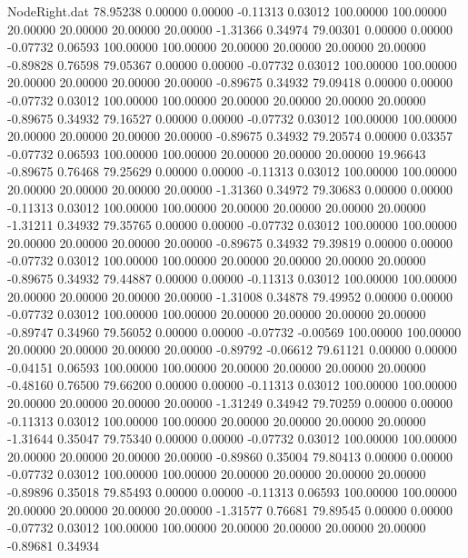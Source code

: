 \begin{filecontents}{NodeRight.dat}
  78.95238    0.00000    0.00000    -0.11313    0.03012  100.00000  100.00000   20.00000   20.00000   20.00000   20.00000   -1.31366    0.34974
  79.00301    0.00000    0.00000    -0.07732    0.06593  100.00000  100.00000   20.00000   20.00000   20.00000   20.00000   -0.89828    0.76598
  79.05367    0.00000    0.00000    -0.07732    0.03012  100.00000  100.00000   20.00000   20.00000   20.00000   20.00000   -0.89675    0.34932
  79.09418    0.00000    0.00000    -0.07732    0.03012  100.00000  100.00000   20.00000   20.00000   20.00000   20.00000   -0.89675    0.34932
  79.16527    0.00000    0.00000    -0.07732    0.03012  100.00000  100.00000   20.00000   20.00000   20.00000   20.00000   -0.89675    0.34932
  79.20574    0.00000    0.03357    -0.07732    0.06593  100.00000  100.00000   20.00000   20.00000   20.00000   19.96643   -0.89675    0.76468
  79.25629    0.00000    0.00000    -0.11313    0.03012  100.00000  100.00000   20.00000   20.00000   20.00000   20.00000   -1.31360    0.34972
  79.30683    0.00000    0.00000    -0.11313    0.03012  100.00000  100.00000   20.00000   20.00000   20.00000   20.00000   -1.31211    0.34932
  79.35765    0.00000    0.00000    -0.07732    0.03012  100.00000  100.00000   20.00000   20.00000   20.00000   20.00000   -0.89675    0.34932
  79.39819    0.00000    0.00000    -0.07732    0.03012  100.00000  100.00000   20.00000   20.00000   20.00000   20.00000   -0.89675    0.34932
  79.44887    0.00000    0.00000    -0.11313    0.03012  100.00000  100.00000   20.00000   20.00000   20.00000   20.00000   -1.31008    0.34878
  79.49952    0.00000    0.00000    -0.07732    0.03012  100.00000  100.00000   20.00000   20.00000   20.00000   20.00000   -0.89747    0.34960
  79.56052    0.00000    0.00000    -0.07732   -0.00569  100.00000  100.00000   20.00000   20.00000   20.00000   20.00000   -0.89792   -0.06612
  79.61121    0.00000    0.00000    -0.04151    0.06593  100.00000  100.00000   20.00000   20.00000   20.00000   20.00000   -0.48160    0.76500
  79.66200    0.00000    0.00000    -0.11313    0.03012  100.00000  100.00000   20.00000   20.00000   20.00000   20.00000   -1.31249    0.34942
  79.70259    0.00000    0.00000    -0.11313    0.03012  100.00000  100.00000   20.00000   20.00000   20.00000   20.00000   -1.31644    0.35047
  79.75340    0.00000    0.00000    -0.07732    0.03012  100.00000  100.00000   20.00000   20.00000   20.00000   20.00000   -0.89860    0.35004
  79.80413    0.00000    0.00000    -0.07732    0.03012  100.00000  100.00000   20.00000   20.00000   20.00000   20.00000   -0.89896    0.35018
  79.85493    0.00000    0.00000    -0.11313    0.06593  100.00000  100.00000   20.00000   20.00000   20.00000   20.00000   -1.31577    0.76681
  79.89545    0.00000    0.00000    -0.07732    0.03012  100.00000  100.00000   20.00000   20.00000   20.00000   20.00000   -0.89681    0.34934
\end{filecontents}
